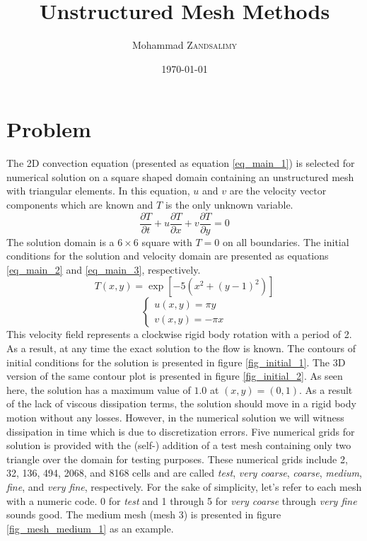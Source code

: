\documentclass{article}
\title{Unstructured Mesh Methods}
\author{Mohammad \textsc{Zandsalimy}}
\date{\today}
\begin{document}
\maketitle


\section{Problem}
The 2D convection equation (presented as equation \ref{eq_main_1}) is selected for numerical solution on a square shaped domain containing an unstructured mesh with triangular elements. In this equation, $u$ and $v$ are the velocity vector components which are known and $T$ is the only unknown variable.
\begin{equation}
\label{eq_main_1}
\dfrac{\partial T}{\partial t}+u\dfrac{\partial T}{\partial x}+v\dfrac{\partial T}{\partial y}=0
\end{equation}
The solution domain is a $6 \times 6$ square  with $T=0$ on all boundaries. The initial conditions for the solution and velocity domain are presented as equations \ref{eq_main_2} and \ref{eq_main_3}, respectively.
\begin{equation}
\label{eq_main_2}
T(x,y)=\exp\left[-5 \left( x^2 +(y-1)^2 \right) \right]
\end{equation}
\begin{equation}
\label{eq_main_3}
\begin{cases}
u(x,y)=\pi y \\[10pt]
v(x,y)=-\pi x
\end{cases}
\end{equation}
This velocity field represents a clockwise rigid body rotation with a period of 2. As a result, at any time the exact solution to the flow is known. The contours of initial conditions for the solution is presented in figure \ref{fig_initial_1}. The 3D version of the same contour plot is presented in figure \ref{fig_initial_2}. As seen here, the solution has a maximum value of $1.0$ at $(x,y)=(0,1)$. As a result of the lack of viscous dissipation terms, the solution should move in a rigid body motion without any losses. However, in the numerical solution we will witness dissipation in time which is due to discretization errors. Five numerical grids for solution is provided with the (self-) addition of a test mesh containing only two triangle over the domain for testing purposes. These numerical grids include 2, 32, 136, 494, 2068, and 8168 cells and are called \textit{test}, \textit{very coarse}, \textit{coarse}, \textit{medium}, \textit{fine}, and \textit{very fine}, respectively. For the sake of simplicity, let's refer to each mesh with a numeric code. 0 for \textit{test} and 1 through 5 for \textit{very coarse} through \textit{very fine} sounds good. The medium mesh (mesh 3) is presented in figure \ref{fig_mesh_medium_1} as an example.
\end{document}
